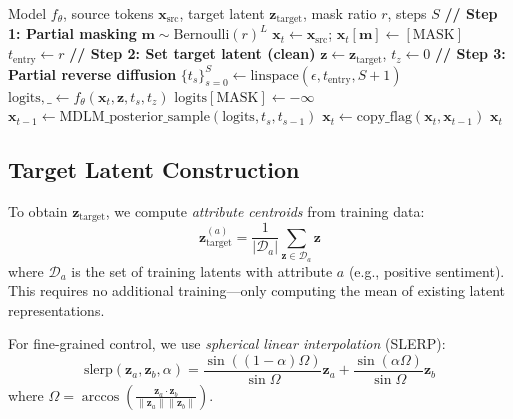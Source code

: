 \documentclass{article}
\begin{document}
\begin{algorithm}[t]
\caption{LSME: Latent-Steered Masked Editing}
\label{alg:lsme}
\begin{algorithmic}[1]
\REQUIRE Model $f_\theta$, source tokens $\mathbf{x}_\text{src}$, target latent $\mathbf{z}_\text{target}$, mask ratio $r$, steps $S$
\STATE \textbf{// Step 1: Partial masking}
\STATE $\mathbf{m} \sim \text{Bernoulli}(r)^L$ 
\STATE $\mathbf{x}_t \leftarrow \mathbf{x}_\text{src}$; \quad $\mathbf{x}_t[\mathbf{m}] \leftarrow [\text{MASK}]$
\STATE $t_\text{entry} \leftarrow r$
\STATE \textbf{// Step 2: Set target latent (clean)}
\STATE $\mathbf{z} \leftarrow \mathbf{z}_\text{target}$, \quad $t_z \leftarrow 0$
\STATE \textbf{// Step 3: Partial reverse diffusion}
\STATE $\{t_s\}_{s=0}^{S} \leftarrow \text{linspace}(\epsilon, t_\text{entry}, S+1)$
    \STATE $\text{logits}, \_ \leftarrow f_\theta(\mathbf{x}_t, \mathbf{z}, t_s, t_z)$
    \STATE $\text{logits}[\text{MASK}] \leftarrow -\infty$
    \STATE $\mathbf{x}_{t-1} \leftarrow \text{MDLM\_posterior\_sample}(\text{logits}, t_s, t_{s-1})$
    \STATE $\mathbf{x}_t \leftarrow \text{copy\_flag}(\mathbf{x}_t, \mathbf{x}_{t-1})$ 
\ENDFOR
\RETURN $\mathbf{x}_t$
\end{algorithmic}
\end{algorithm}

\subsection{Target Latent Construction}

To obtain $\mathbf{z}_\text{target}$, we compute \emph{attribute centroids} from training data:
\begin{equation}
    \mathbf{z}_\text{target}^{(a)} = \frac{1}{|\mathcal{D}_a|} \sum_{\mathbf{z} \in \mathcal{D}_a} \mathbf{z}
\end{equation}
where $\mathcal{D}_a$ is the set of training latents with attribute $a$ (e.g., positive sentiment).
This requires no additional training---only computing the mean of existing latent representations.

For fine-grained control, we use \emph{spherical linear interpolation} (SLERP):
\begin{equation}
    \text{slerp}(\mathbf{z}_a, \mathbf{z}_b, \alpha) = \frac{\sin((1-\alpha)\Omega)}{\sin \Omega} \mathbf{z}_a + \frac{\sin(\alpha \Omega)}{\sin \Omega} \mathbf{z}_b
\end{equation}
where $\Omega = \arccos\left(\frac{\mathbf{z}_a \cdot \mathbf{z}_b}{\|\mathbf{z}_a\| \|\mathbf{z}_b\|}\right)$.
\end{document}

